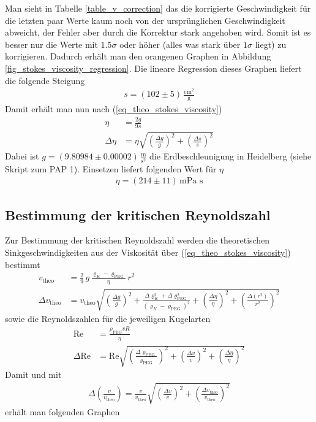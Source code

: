 \documentclass[12pt,a4paper,german]{scrartcl}
\numberwithin{equation}{section}
\begin{document}
  Man sieht in Tabelle \ref{table_v_correction} das die korrigierte Geschwindigkeit für die letzten paar Werte kaum noch von der ursprünglichen Geschwindigkeit abweicht, der Fehler aber durch die Korrektur stark angehoben wird.
  Somit ist es besser nur die Werte mit $1.5\sigma$ oder höher (alles was stark über $1\sigma$ liegt) zu korrigieren. Dadurch erhält man den orangenen Graphen in Abbildung \ref{fig_stokes_viscosity_regression}. Die lineare Regression dieses Graphen liefert die folgende Steigung
  \begin{align}
    s = (102 \pm 5) \, \frac{\text{cm}^2}{\text{g}}
  \end{align}
  Damit erhält man nun nach (\ref{eq_theo_stokes_viscosity})
  \begin{align}
    \eta &= \frac{2 g}{9 s} \nonumber \\
    \Delta \eta &= \eta \sqrt{\left(\frac{\Delta g}{g}\right)^2 + \left(\frac{\Delta s}{s}\right)^2}
  \end{align}
  Dabei ist $g = (9.80984 \pm 0.00002) \, \frac{\text{m}}{\text{s}^2}$ die Erdbeschleunigung in Heidelberg (siehe Skript zum PAP 1). Einsetzen liefert folgenden Wert für $\eta$
  \begin{align}
    \eta = (214 \pm 11) \, \text{mPa s}
  \end{align}

  \subsection{Bestimmung der kritischen Reynoldszahl}
  Zur Bestimmung der kritischen Reynoldszahl werden die \glqq theoretischen\grqq{} Sinkgeschwindigkeiten aus der Viskosität über (\ref{eq_theo_stokes_viscosity}) bestimmt
  \begin{align}
    v_\text{theo} &= \frac{2}{9} \, g \, \frac{\varrho_K - \varrho_\text{PEG}}{\eta} \, r^2 \nonumber \\
    \Delta v_\text{theo} &= v_\text{theo} \sqrt{\left(\frac{\Delta g}{g}\right)^2 + \frac{\Delta\varrho_K^2 + \Delta\varrho_\text{PEG}^2}{(\varrho_K - \varrho_\text{PEG})^2} + \left(\frac{\Delta\eta}{\eta}\right)^2 + \left(\frac{\Delta (r^2)}{r^2}\right)^2}
  \end{align}
  sowie die Reynoldszahlen für die jeweiligen Kugelarten
  \begin{align}
    \text{Re} &= \frac{\rho_\text{PEG} v R}{\eta} \nonumber \\
    \Delta \text{Re} &= \text{Re} \sqrt{\left(\frac{\Delta \varrho_\text{PEG}}{\varrho_\text{PEG}}\right)^2 + \left(\frac{\Delta v}{v}\right)^2 + \left(\frac{\Delta\eta}{\eta}\right)^2}
  \end{align}
  Damit und mit
  \begin{align}
    \Delta \left(\frac{v}{v_\text{theo}} \right) = \frac{v}{v_\text{theo}} \sqrt{\left(\frac{\Delta v}{v}\right)^2 + \left(\frac{\Delta v_\text{theo}}{v_\text{theo}}\right)^2}
  \end{align}
  erhält man folgenden Graphen
  
\end{document}
